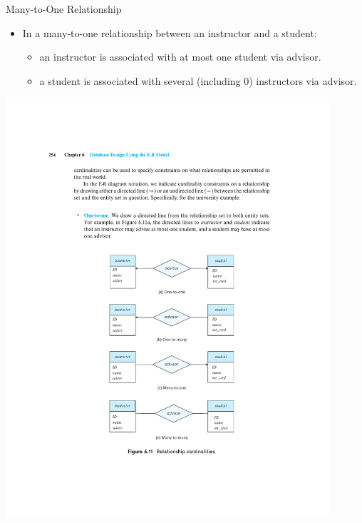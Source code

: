 \documentclass{beamer}
\begin{document}
\begin{frame}{Many-to-One Relationship}
    \begin{itemize}
        \item In a many-to-one relationship between an instructor and a student:
        \begin{itemize}
            \item an instructor is associated with at most one student via advisor.
            \item a student is associated with several (including 0) instructors via advisor.
        \end{itemize}
    \end{itemize}
    \centering
    \includegraphics[trim={6cm 8.75cm 6cm 16.5cm}, clip, width=0.9\textwidth]{figures/p254}
\end{frame}
\end{document}
